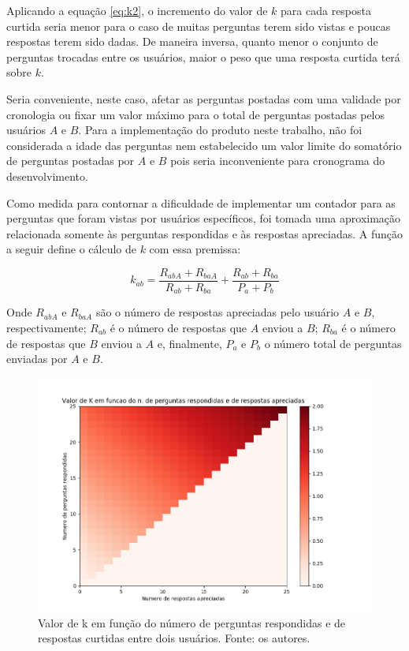 Aplicando a equação \ref{eq:k2}, o incremento do valor de $k$ para cada resposta curtida seria menor para o caso de muitas perguntas terem sido vistas e poucas respostas terem sido dadas. De maneira inversa, quanto menor o conjunto de perguntas trocadas entre os usuários, maior o peso que uma resposta curtida terá sobre $k$.

Seria conveniente, neste caso, afetar as perguntas postadas com uma validade por cronologia ou fixar um valor máximo para o total de perguntas postadas pelos usuários $A$ e $B$. Para a implementação do produto neste trabalho, não foi considerada a idade das perguntas nem estabelecido um valor limite do somatório de perguntas postadas por $A$ e $B$ pois seria inconveniente para cronograma do desenvolvimento.

Como medida para contornar a dificuldade de implementar um contador para as perguntas que foram vistas por usuários específicos, foi tomada uma aproximação relacionada somente às perguntas respondidas e às respostas apreciadas. A função a seguir define o cálculo de $k$ com essa premissa:

\begin{equation}
k_{ab} = \frac{R_{abA} + R_{baA}}{R_{ab} + R_{ba}} + \frac{R_{ab} + R_{ba}}{P_{a}+P_{b}}
\label{eq:k3}
\end{equation}

Onde $R_{abA}$ e $R_{baA}$ são o número de respostas apreciadas pelo usuário $A$ e $B$, respectivamente; $R_{ab}$ é o número de respostas que $A$ enviou a $B$; $R_{ba}$ é o número de respostas que $B$ enviou a $A$ e, finalmente, $P_{a}$ e $P_{b}$ o número total de perguntas enviadas por $A$ e $B$.

\begin{figure}[!htb]
\centering
\includegraphics[width=14cm]{matriz_k.png}
\caption{Valor de k em função do número de perguntas respondidas e de respostas curtidas entre dois usuários. Fonte: os autores.}
\label{fig:matrizk}
\end{figure}

